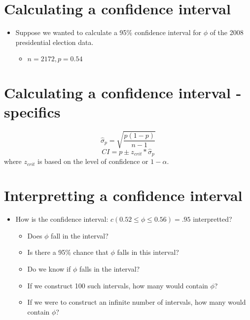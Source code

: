 \documentclass[12pt]{article}
\begin{document}
\section{Calculating a confidence
interval}\label{calculating-a-confidence-interval}

\begin{itemize}
\itemsep1pt\parskip0pt
\item
  Suppose we wanted to calculate a 95\% confidence interval for \(\phi\)
  of the 2008 presidential election data.

  \begin{itemize}
  \itemsep1pt\parskip0pt
  \item
    \(n = 2172, p = 0.54\)
  \end{itemize}
\end{itemize}

\section{Calculating a confidence interval -
specifics}\label{calculating-a-confidence-interval---specifics}

\[ \hat{\sigma}_{p} = \sqrt{\frac{p (1 - p)}{n - 1}} \]
\[ CI = p \pm z_{crit} * \hat{\sigma}_{p} \] where \(z_{crit}\) is based
on the level of confidence or \(1 - \alpha\).

\section{Interpretting a confidence
interval}\label{interpretting-a-confidence-interval}

\begin{itemize}
\itemsep1pt\parskip0pt
\item
  How is the confidence interval: \(c(0.52 \leq \phi \leq 0.56) = .95\)
  interpretted?

  \begin{itemize}
  \itemsep1pt\parskip0pt
  \item
    Does \(\phi\) fall in the interval?
  \item
    Is there a 95\% chance that \(\phi\) falls in this interval?
  \item
    Do we know if \(\phi\) falls in the interval?
  \item
    If we construct 100 such intervals, how many would contain \(\phi\)?
  \item
    If we were to construct an infinite number of intervals, how many
    would contain \(\phi\)?
  \end{itemize}
\end{itemize}
\end{document}
